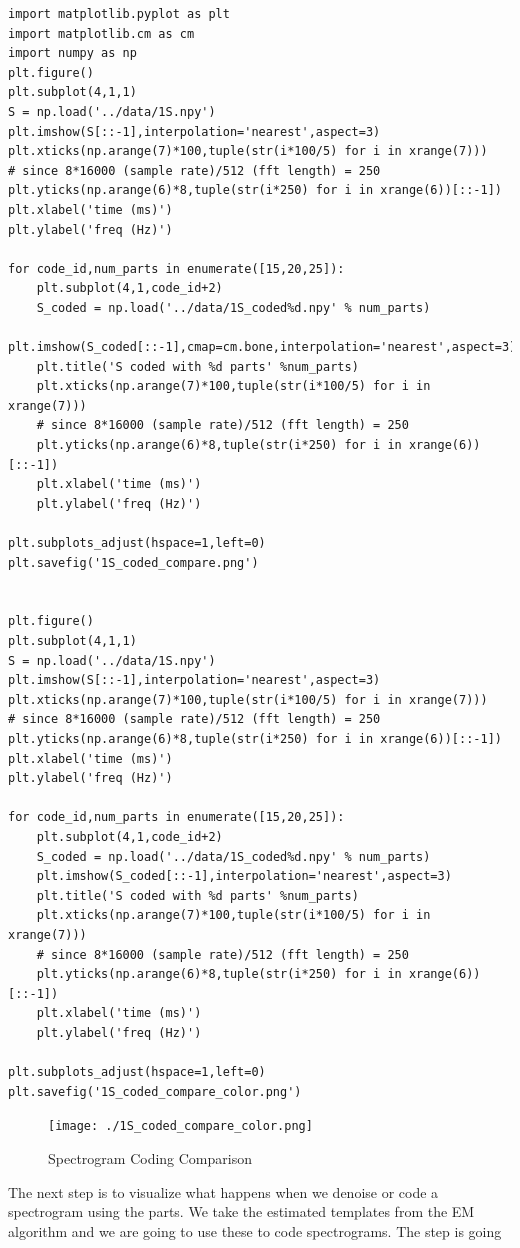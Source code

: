 \documentclass[11pt]{article}
\begin{document}
\begin{verbatim}
import matplotlib.pyplot as plt
import matplotlib.cm as cm
import numpy as np
plt.figure()
plt.subplot(4,1,1)
S = np.load('../data/1S.npy')
plt.imshow(S[::-1],interpolation='nearest',aspect=3)
plt.xticks(np.arange(7)*100,tuple(str(i*100/5) for i in xrange(7)))
# since 8*16000 (sample rate)/512 (fft length) = 250
plt.yticks(np.arange(6)*8,tuple(str(i*250) for i in xrange(6))[::-1])
plt.xlabel('time (ms)')
plt.ylabel('freq (Hz)')

for code_id,num_parts in enumerate([15,20,25]):
    plt.subplot(4,1,code_id+2)
    S_coded = np.load('../data/1S_coded%d.npy' % num_parts)
    plt.imshow(S_coded[::-1],cmap=cm.bone,interpolation='nearest',aspect=3)
    plt.title('S coded with %d parts' %num_parts)
    plt.xticks(np.arange(7)*100,tuple(str(i*100/5) for i in xrange(7)))
    # since 8*16000 (sample rate)/512 (fft length) = 250
    plt.yticks(np.arange(6)*8,tuple(str(i*250) for i in xrange(6))[::-1])
    plt.xlabel('time (ms)')
    plt.ylabel('freq (Hz)')

plt.subplots_adjust(hspace=1,left=0)
plt.savefig('1S_coded_compare.png')


plt.figure()
plt.subplot(4,1,1)
S = np.load('../data/1S.npy')
plt.imshow(S[::-1],interpolation='nearest',aspect=3)
plt.xticks(np.arange(7)*100,tuple(str(i*100/5) for i in xrange(7)))
# since 8*16000 (sample rate)/512 (fft length) = 250
plt.yticks(np.arange(6)*8,tuple(str(i*250) for i in xrange(6))[::-1])
plt.xlabel('time (ms)')
plt.ylabel('freq (Hz)')

for code_id,num_parts in enumerate([15,20,25]):
    plt.subplot(4,1,code_id+2)
    S_coded = np.load('../data/1S_coded%d.npy' % num_parts)
    plt.imshow(S_coded[::-1],interpolation='nearest',aspect=3)
    plt.title('S coded with %d parts' %num_parts)
    plt.xticks(np.arange(7)*100,tuple(str(i*100/5) for i in xrange(7)))
    # since 8*16000 (sample rate)/512 (fft length) = 250
    plt.yticks(np.arange(6)*8,tuple(str(i*250) for i in xrange(6))[::-1])
    plt.xlabel('time (ms)')
    plt.ylabel('freq (Hz)')

plt.subplots_adjust(hspace=1,left=0)
plt.savefig('1S_coded_compare_color.png')
\end{verbatim}


\begin{figure}[htb]
\centering
\texttt{[image: ./1S\_coded\_compare\_color.png]}
\caption{\label{fig:1S_coded_compare}Spectrogram Coding Comparison}
\end{figure}



The next step is to visualize what happens when we denoise or code a
spectrogram using the parts.  We take the estimated templates from the
EM algorithm and we are going to use these to code spectrograms.  The
step is going
\end{document}
